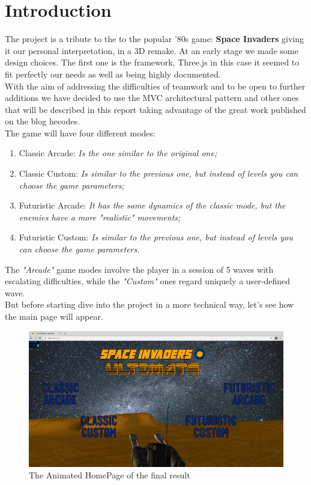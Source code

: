 \section{Introduction}
The project is a tribute to the to the popular '80s game: \textbf{Space Invaders} giving it our personal interpretation, in a 3D remake. At an early stage we made some design choices. The first one is the framework, Three.js in this case it seemed to fit perfectly our needs as well as being highly documented. \\
With the aim of addressing the difficulties of teamwork and to be open to further additions we have decided to use the MVC architectural pattern and other ones that will be described in this report taking advantage of the great work published on the blog hecodes.\\
The game will have four different modes:
\begin{enumerate}
\item Classic Arcade: \textit{Is the one similar to the original one;}
\item Classic Custom: \textit{Is similar to the previous one, but instead of levels you can choose the game parameters;}
\item Futuristic Arcade: \textit{It has the same dynamics of the classic mode, but the enemies have a more "realistic" movements;}
\item Futuristic Custom: \textit{Is similar to the previous one, but instead of levels you can choose the game parameters.}
\end{enumerate}
The \textit{"Arcade"} game modes involve the player in a session of 5 waves with escalating difficulties, while the \textit{"Custom"} ones regard uniquely a user-defined wave.\\
But before starting dive into the project in a more technical way, let's see how the main page will appear.
\begin{figure}[h!]
\begin{center}
\includegraphics[scale=0.4]{images/siu-homepage.jpg}
\caption{The Animated HomePage of the final result}
\end{center}
\end{figure}